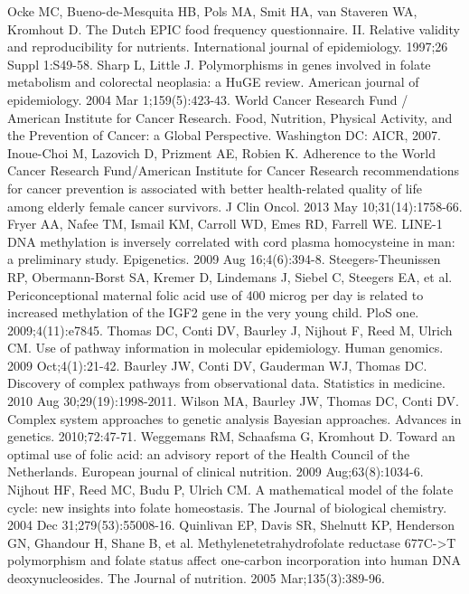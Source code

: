 \begin{thebibliography}{12}
		Ocke MC, Bueno-de-Mesquita HB, Pols MA, Smit HA, van Staveren WA, Kromhout D. The Dutch EPIC food frequency questionnaire. II. Relative validity and reproducibility for nutrients. International journal of epidemiology. 1997;26 Suppl 1:S49-58.
		Sharp L, Little J. Polymorphisms in genes involved in folate metabolism and colorectal neoplasia: a HuGE review. American journal of epidemiology. 2004 Mar 1;159(5):423-43.
		World Cancer Research Fund / American Institute for Cancer Research. Food, Nutrition, Physical Activity, and the Prevention of Cancer: a Global Perspective. Washington DC: AICR, 2007.
		Inoue-Choi M, Lazovich D, Prizment AE, Robien K. Adherence to the World Cancer Research Fund/American Institute for Cancer Research recommendations for cancer prevention is associated with better health-related quality of life among elderly female cancer survivors. J Clin Oncol. 2013 May 10;31(14):1758-66.
		Fryer AA, Nafee TM, Ismail KM, Carroll WD, Emes RD, Farrell WE. LINE-1 DNA methylation is inversely correlated with cord plasma homocysteine in man: a preliminary study. Epigenetics. 2009 Aug 16;4(6):394-8.
		Steegers-Theunissen RP, Obermann-Borst SA, Kremer D, Lindemans J, Siebel C, Steegers EA, et al. Periconceptional maternal folic acid use of 400 microg per day is related to increased methylation of the IGF2 gene in the very young child. PloS one. 2009;4(11):e7845.
		Thomas DC, Conti DV, Baurley J, Nijhout F, Reed M, Ulrich CM. Use of pathway information in molecular epidemiology. Human genomics. 2009 Oct;4(1):21-42.
		Baurley JW, Conti DV, Gauderman WJ, Thomas DC. Discovery of complex pathways from observational data. Statistics in medicine. 2010 Aug 30;29(19):1998-2011.
		Wilson MA, Baurley JW, Thomas DC, Conti DV. Complex system approaches to genetic analysis Bayesian approaches. Advances in genetics. 2010;72:47-71.
		Weggemans RM, Schaafsma G, Kromhout D. Toward an optimal use of folic acid: an advisory report of the Health Council of the Netherlands. European journal of clinical nutrition. 2009 Aug;63(8):1034-6.
		Nijhout HF, Reed MC, Budu P, Ulrich CM. A mathematical model of the folate cycle: new insights into folate homeostasis. The Journal of biological chemistry. 2004 Dec 31;279(53):55008-16.
		Quinlivan EP, Davis SR, Shelnutt KP, Henderson GN, Ghandour H, Shane B, et al. Methylenetetrahydrofolate reductase 677C->T polymorphism and folate status affect one-carbon incorporation into human DNA deoxynucleosides. The Journal of nutrition. 2005 Mar;135(3):389-96.

\end{thebibliography}
